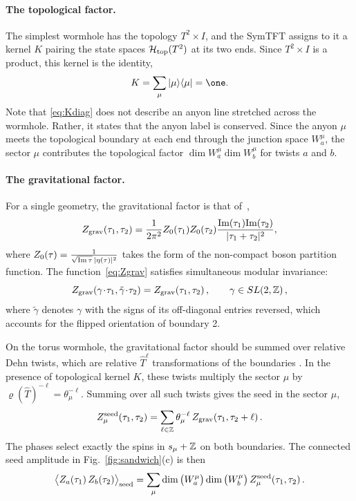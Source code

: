 \documentclass[11pt]{article}
\numberwithin{equation}{section}
\newcommand{\Htop}{\Hil_{\rm top}}
\newcommand{\Zgrav}{Z_{\rm grav}}
\newcommand{\vr}{\varrho}
\begin{document}
\paragraph{The topological factor.}
The simplest wormhole has the topology $T^2\times I$, and the SymTFT assigns to it a kernel $K$ pairing the state spaces $\Htop(T^2)$ at its two ends. Since $T^2\times I$ is a product, this kernel is the identity,
\begin{equation}\label{eq:Kdiag}
K=\sum_\mu|\mu\rangle\langle\mu|=\one.
\end{equation}
Note that \eqref{eq:Kdiag} does not describe an anyon line stretched across the wormhole. Rather, it states that the anyon label is conserved. Since the anyon $\mu$ meets the topological boundary at each end through the junction space $W_a^\mu$, the sector $\mu$ contributes the topological factor $\dim W_a^\mu\dim W_b^\mu$ for twists $a$ and $b$.

\paragraph{The gravitational factor.}
For a single geometry, the gravitational factor is that of~\cite{Cotler:2020ugk},
\begin{equation}\label{eq:Zgrav}
\Zgrav(\tau_1,\tau_2)
= \frac{1}{2\pi^2}Z_0(\tau_1) Z_0(\tau_{2})\frac{\text{Im}(\tau_{1}) \text{Im}(\tau_2)}{|\tau_1+\tau_2|^2},
\end{equation}
where $Z_0(\tau)=\frac{1}{\sqrt{{\rm Im}\,\tau}\,|\eta(\tau)|^2}$ takes the form of the non-compact boson partition function. The function~\eqref{eq:Zgrav}  satisfies simultaneous modular invariance:
\begin{equation}\label{eq:gravinv}
\Zgrav(\gamma\!\cdot\!\tau_1,\tilde\gamma\!\cdot\!\tau_2)=\Zgrav(\tau_1,\tau_2)\,,\qquad\gamma\in SL(2,\Z)\,,
\end{equation}
where $\tilde\gamma$ denotes $\gamma$ with the signs of its off-diagonal entries reversed, which accounts for the flipped orientation of boundary 2.

On the torus wormhole, the  gravitational factor should be summed over relative Dehn twists, which are relative $\hat T^{\ell}$ transformations of the boundaries \cite{Cotler:2020ugk}. In the presence of topological kernel $K$,  these twists  multiply the sector $\mu$ by $\vr(\hat T)^{-\ell}=\theta_{\mu}^{-\ell}$. Summing over all such twists gives the seed in the sector $\mu$,
\begin{equation}\label{eq:seedGamma}
Z_\mu^{\rm seed}(\tau_1,\tau_2)=\sum_{\ell\in\Z}\theta_\mu^{-\ell}\,\Zgrav(\tau_1,\tau_2+\ell)\,.
\end{equation}
The phases select exactly the spins in $s_\mu+\mathbb Z$ on both boundaries. The connected seed amplitude in Fig.~\ref{fig:sandwich}(c) is then
\begin{equation}\label{eq:seedamp}
\big\langle Z_a(\tau_1)\,Z_b(\tau_2)\big\rangle_{\rm seed}=\sum_\mu\dim\big(W_a^\mu\big)\dim\big(W_b^\mu\big)\,Z_\mu^{\rm seed}(\tau_1,\tau_2)\,.
\end{equation}
\end{document}
